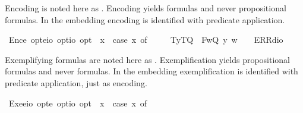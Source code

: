 \begin{isabellebody}
\begin{isamarkuptext}
 Encoding  is noted here as . 
 Encoding yields formulas and never propositional formulas. In the embedding encoding 
 is identified with predicate application.%
\end{isamarkuptext}%
\isamarkuptrue%
\isamarkupfalse%
\ Enc{\isacharcolon}{\isacharcolon}{\isachardoublequoteopen}e\ opt{\isasymRightarrow}{\isacharparenleft}e{\isasymRightarrow}io{\isacharparenright}\ opt{\isasymRightarrow}io\ opt{\isachardoublequoteclose}{\isacharparenleft}{\isachardoublequoteopen}{\isasymlbrace}{\isacharunderscore}{\isacharcomma}{\isacharunderscore}{\isasymrbrace}{\isachardoublequoteclose}{\isacharparenright}\ \ {\isachardoublequoteopen}{\isasymlbrace}x{\isacharcomma}{\isasymPhi}{\isasymrbrace}\ {\isasymequiv}\ case\ {\isacharparenleft}x{\isacharcomma}{\isasymPhi}{\isacharparenright}\ of\ \isanewline
\ \ \ \ {\isacharparenleft}T{\isacharparenleft}y{\isacharparenright}{\isacharcomma}T{\isacharparenleft}Q{\isacharparenright}{\isacharparenright}\ {\isasymRightarrow}\ F{\isacharparenleft}{\isasymlambda}w{\isachardot}{\isacharparenleft}Q\ y{\isacharparenright}\ w{\isacharparenright}\ {\isacharbar}\ {\isacharunderscore}\ {\isasymRightarrow}\ ERR{\isacharparenleft}dio{\isacharparenright}{\isachardoublequoteclose}%
\begin{isamarkuptext}%
Exemplifying formulas  are noted here as .  
 Exemplification yields propositional formulas and never formulas. In the embedding exemplification 
 is identified with predicate application, just as encoding.%
\end{isamarkuptext}%
\isamarkuptrue%
\isamarkupfalse%
\ Exe{}{\isacharcolon}{\isacharcolon}{\isachardoublequoteopen}{\isacharparenleft}e{\isasymRightarrow}io{\isacharparenright}\ opt{\isasymRightarrow}e\ opt{\isasymRightarrow}io\ opt{\isachardoublequoteclose}{\isacharparenleft}{\isachardoublequoteopen}{\isasymlparr}{\isacharunderscore}{\isacharcomma}{\isacharunderscore}{\isasymrparr}{\isachardoublequoteclose}{\isacharparenright}\ \ {\isachardoublequoteopen}{\isasymlparr}{\isasymPhi}{\isacharcomma}x{\isasymrparr}\ {\isasymequiv}\ case\ {\isacharparenleft}{\isasymPhi}{\isacharcomma}x{\isacharparenright}\ of\ \isanewline

\end{isabellebody}
